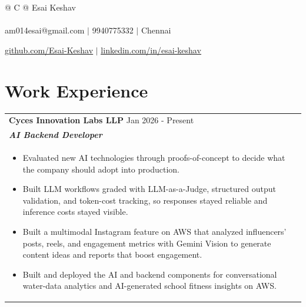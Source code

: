 \documentclass[a4paper,8pt]{article}
\begin{document}
\pagestyle{empty}

\begin{tabularx}{\linewidth}{@{} C @{}}
\color[HTML]{1C033C} \Huge{Esai Keshav} \\[6pt]
\\
\textcolor[HTML]{371e77}{{{{\faEnvelope} am014esai@gmail.com}} $|$}
\textcolor[HTML]{371e77}{{{\faPhone} 9940775332}} $|$
\textcolor[HTML]{371e77}{{{\faMapMarker*} Chennai}}

\href{https://github.com/Esai-Keshav}{\textcolor[HTML]{371e77}{\underline{{\raisebox{-0.05\height}{\faGithub} github.com/Esai-Keshav}}}} $|$
\href{https://www.linkedin.com/in/esai-keshav/}{\textcolor[HTML]{371e77}{\underline{{\raisebox{-0.05\height}{\faLinkedin} linkedin.com/in/esai-keshav}}}}
\end{tabularx}

\section{Work Experience}


\begin{tabularx}{\linewidth}{ @{}l r@{} }
\color[HTML]{1C033C} \textbf{{Cyces Innovation Labs LLP}} \hfill \color[HTML]{371e77} Jan 2026 - Present \\[4pt]
\color[HTML]{371e77}\textbf{\textit{AI Backend Developer}}\ \hfill \color[HTML]{4B28A4} \\[5pt]
\begin{minipage}[t]{\linewidth}
    \begin{itemize}[nosep,after=\strut, leftmargin=2em, itemsep=2pt]
        \item Evaluated new AI technologies through proofs-of-concept to decide what the company should adopt into production.
        \item Built LLM workflows graded with LLM-as-a-Judge, structured output validation, and token-cost tracking, so responses stayed reliable and inference costs stayed visible.
        \item Built a multimodal Instagram feature on AWS that analyzed influencers' posts, reels, and engagement metrics with Gemini Vision to generate content ideas and reports that boost engagement.
        \item Built and deployed the AI and backend components for conversational water-data analytics and AI-generated school fitness insights on AWS.
    \end{itemize}
\end{minipage}
\end{tabularx}
\end{document}

